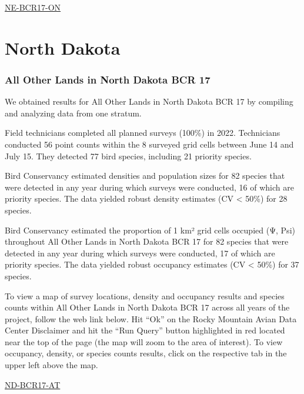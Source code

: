 \documentclass[
  letterpaper,
  DIV=11,
  numbers=noendperiod,
  oneside]{scrreprt}
\begin{document}
\href{http://www.rmbo.org/new_site/adc/QueryWindow.aspx\#N4IgzgLgTghhCuBbEAuABCAcgUQLQCEBhAJQEYB2XAeU3QEEAbBtKiACwFMo0AZGAOwAmYEAF8gA}{NE-BCR17-ON}

\hypertarget{north-dakota}{%
\section{North Dakota}\label{north-dakota}}

\hypertarget{all-other-lands-in-north-dakota-bcr-17}{%
\subsubsection{All Other Lands in North Dakota BCR
17}\label{all-other-lands-in-north-dakota-bcr-17}}

We obtained results for All Other Lands in North Dakota BCR 17 by
compiling and analyzing data from one stratum.

Field technicians completed all planned surveys (100\%) in 2022.
Technicians conducted 56 point counts within the 8 surveyed grid cells
between June 14 and July 15. They detected 77 bird species, including 21
priority species.

Bird Conservancy estimated densities and population sizes for 82 species
that were detected in any year during which surveys were conducted, 16
of which are priority species. The data yielded robust density estimates
(CV \textless{} 50\%) for 28 species.

Bird Conservancy estimated the proportion of 1 km² grid cells occupied
(Ψ, Psi) throughout All Other Lands in North Dakota BCR 17 for 82
species that were detected in any year during which surveys were
conducted, 17 of which are priority species. The data yielded robust
occupancy estimates (CV \textless{} 50\%) for 37 species.

To view a map of survey locations, density and occupancy results and
species counts within All Other Lands in North Dakota BCR 17 across all
years of the project, follow the web link below. Hit ``Ok'' on the Rocky
Mountain Avian Data Center Disclaimer and hit the ``Run Query'' button
highlighted in red located near the top of the page (the map will zoom
to the area of interest). To view occupancy, density, or species counts
results, click on the respective tab in the upper left above the map.

\href{http://www.rmbo.org/new_site/adc/QueryWindow.aspx\#N4IgzgLgTghhCuBbEAuABCAcgEQLQCEBhAJQEYB2XAQQBV0qAbBtAeQgAsBTKNAGRgB2AEzAgAvkA===}{ND-BCR17-AT}
\end{document}
